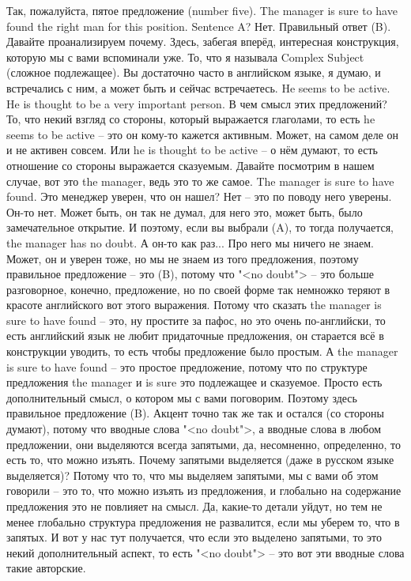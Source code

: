 \documentclass[main.tex]{subfiles}
\begin{document}
Так, пожалуйста, пятое предложение (number five).
The manager is sure to have found the right man for this position.
Sentence A?
Нет.
Правильный ответ (B).
Давайте проанализируем почему.
Здесь, забегая вперёд, интересная конструкция, которую мы с вами вспоминали уже.
То, что я называла Complex Subject (сложное подлежащее).
Вы достаточно часто в английском языке, я думаю, и встречались с ним, а может быть и сейчас встречаетесь.
He seems to be active.
He is thought to be a very important person.
В чем смысл этих предложений?
То, что некий взгляд со стороны, который выражается глаголами, то есть he seems to be active -- это он кому-то кажется активным.
Может, на самом деле он и не активен совсем.
Или he is thought to be active -- о нём думают, то есть отношение со стороны выражается сказуемым.
Давайте посмотрим в нашем случае, вот это the manager, ведь это то же самое.
The manager is sure to have found.
Это менеджер уверен, что он нашел?
Нет -- это по поводу него уверены.
Он-то нет.
Может быть, он так не думал, для него это, может быть, было замечательное открытие.
И поэтому, если вы выбрали (A), то тогда получается, the manager has no doubt.
А он-то как раз...
Про него мы ничего не знаем.
Может, он и уверен тоже, но мы не знаем из того предложения, поэтому правильное предложение -- это (B), потому что "<no doubt"> -- это больше разговорное, конечно, предложение, но по своей форме так немножко теряют в красоте английского вот этого выражения.
Потому что сказать the manager is sure to have found -- это, ну простите за пафос, но это очень по-английски, то есть английский язык не любит придаточные предложения, он старается всё в конструкции уводить, то есть чтобы предложение было простым.
А the manager is sure to have found -- это простое предложение, потому что по структуре предложения the manager и is sure это подлежащее и сказуемое.
Просто есть дополнительный смысл, о котором мы с вами поговорим.
Поэтому здесь правильное предложение (B).
Акцент точно так же так и остался (со стороны думают), потому что вводные слова "<no doubt">, а вводные слова в любом предложении, они выделяются всегда запятыми, да, несомненно, определенно, то есть то, что можно изъять.
Почему запятыми выделяется (даже в русском языке выделяется)?
Потому что то, что мы выделяем запятыми, мы с вами об этом говорили -- это то, что можно изъять из предложения, и глобально на содержание предложения это не повлияет на смысл.
Да, какие-то детали уйдут, но тем не менее глобально структура предложения не развалится, если мы уберем то, что в запятых.
И вот у нас тут получается, что если это выделено запятыми, то это некий дополнительный аспект, то есть "<no doubt"> -- это вот эти вводные слова такие авторские.
\end{document}
